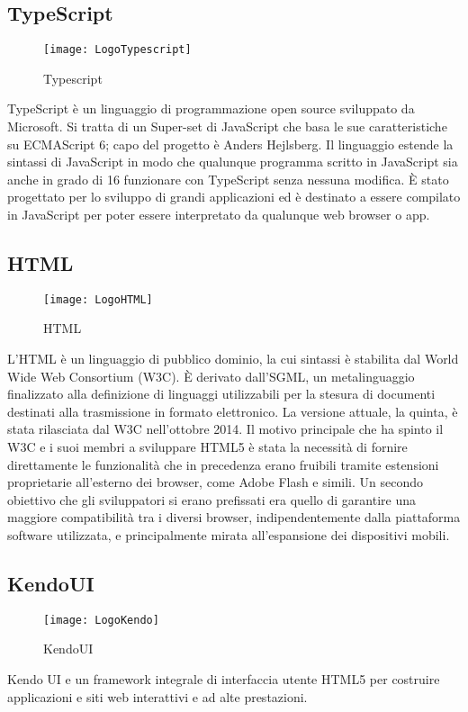 \subsection{TypeScript}
\begin{figure}[htpb!]
\center
  \texttt{[image: LogoTypescript]}
  \caption{Typescript}
\end{figure}
TypeScript è un linguaggio di programmazione open source sviluppato da Microsoft. Si tratta di un Super-set di JavaScript che basa le sue caratteristiche su ECMAScript 6; capo del progetto è Anders Hejlsberg. Il linguaggio estende la sintassi di JavaScript in modo che qualunque programma scritto in JavaScript sia anche in grado di
16
funzionare con TypeScript senza nessuna modifica. È stato progettato per lo sviluppo di grandi applicazioni ed è destinato a essere compilato in JavaScript per poter essere interpretato da qualunque web browser o app.
\subsection{HTML}
\begin{figure}[htpb!]
\center
  \texttt{[image: LogoHTML]}
  \caption{HTML}
\end{figure}
L'HTML è un linguaggio di pubblico dominio, la cui sintassi è stabilita dal World Wide Web Consortium (W3C). È derivato dall'SGML, un metalinguaggio finalizzato alla definizione di linguaggi utilizzabili per la stesura di documenti destinati alla trasmissione in formato elettronico. La versione attuale, la quinta, è stata rilasciata dal W3C nell'ottobre 2014. Il motivo principale che ha spinto il W3C e i suoi membri a sviluppare HTML5 è stata la necessità di fornire direttamente le funzionalità che in precedenza erano fruibili tramite estensioni proprietarie all'esterno dei browser, come Adobe Flash e simili. Un secondo obiettivo che gli sviluppatori si erano prefissati era quello di garantire una maggiore compatibilità tra i diversi browser, indipendentemente dalla piattaforma software utilizzata, e principalmente mirata all'espansione dei dispositivi mobili.
\subsection{KendoUI}
\begin{figure}[htpb!]
\center
  \texttt{[image: LogoKendo]}
  \caption{KendoUI}
\end{figure}
Kendo UI e un framework integrale di interfaccia utente HTML5 per costruire applicazioni e siti web interattivi e ad alte prestazioni.
